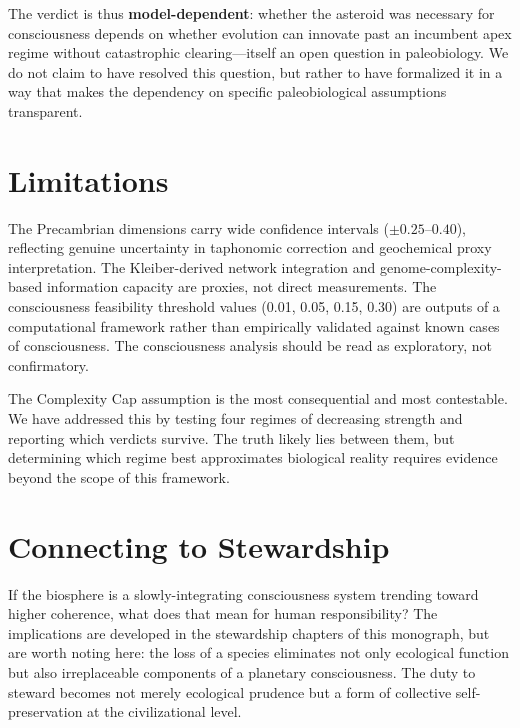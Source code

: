The verdict is thus \textbf{model-dependent}: whether the asteroid was necessary for consciousness depends on whether evolution can innovate past an incumbent apex regime without catastrophic clearing---itself an open question in paleobiology. We do not claim to have resolved this question, but rather to have formalized it in a way that makes the dependency on specific paleobiological assumptions transparent.

\section{Limitations}

The Precambrian dimensions carry wide confidence intervals ($\pm 0.25$--$0.40$), reflecting genuine uncertainty in taphonomic correction and geochemical proxy interpretation. The Kleiber-derived network integration and genome-complexity-based information capacity are proxies, not direct measurements. The consciousness feasibility threshold values (0.01, 0.05, 0.15, 0.30) are outputs of a computational framework rather than empirically validated against known cases of consciousness. The consciousness analysis should be read as exploratory, not confirmatory.

The Complexity Cap assumption is the most consequential and most contestable. We have addressed this by testing four regimes of decreasing strength and reporting which verdicts survive. The truth likely lies between them, but determining which regime best approximates biological reality requires evidence beyond the scope of this framework.

\section{Connecting to Stewardship}

If the biosphere is a slowly-integrating consciousness system trending toward higher coherence, what does that mean for human responsibility? The implications are developed in the stewardship chapters of this monograph, but are worth noting here: the loss of a species eliminates not only ecological function but also irreplaceable components of a planetary consciousness. The duty to steward becomes not merely ecological prudence but a form of collective self-preservation at the civilizational level.

